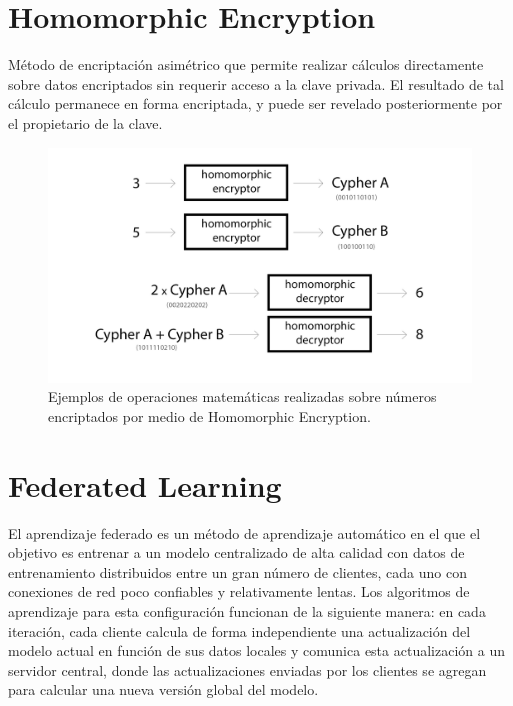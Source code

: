 \documentclass[
11pt, %
oneside, %
spanish, %
singlespacing, %
parskip, %
headsepline, %
chapterinoneline, %
]{MastersDoctoralThesis} %
\begin{document}
\pagebreak

\section{Homomorphic Encryption}
Método de encriptación asimétrico que permite realizar cálculos directamente sobre datos encriptados sin requerir acceso a la clave privada. El resultado de tal cálculo permanece en forma encriptada, y puede ser revelado posteriormente por el propietario de la clave.

\begin{figure}[H]
  	\centering
	\includegraphics[scale=0.5]{imgs/he.png}
	\caption{\cite{he} Ejemplos de operaciones matemáticas realizadas sobre números encriptados por medio de Homomorphic Encryption.}
\end{figure}

\section{Federated Learning}
El aprendizaje federado es un método de aprendizaje automático en el que el objetivo es entrenar a un modelo centralizado de alta calidad con datos de entrenamiento distribuidos entre un gran número de clientes, cada uno con conexiones de red poco confiables y relativamente lentas. Los algoritmos de aprendizaje para esta configuración funcionan de la siguiente manera: en cada iteración, cada cliente calcula de forma independiente una actualización del modelo actual en función de sus datos locales y comunica esta actualización a un servidor central, donde las actualizaciones enviadas por los clientes se agregan para calcular una nueva versión global del modelo.
\end{document}
